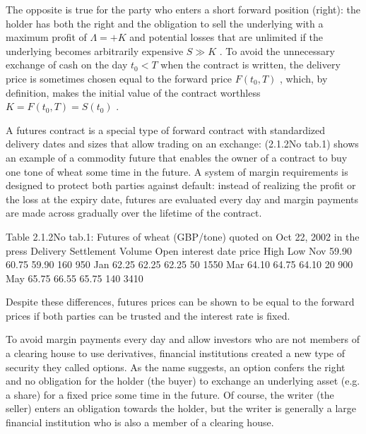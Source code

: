 \documentclass{beamer}
\begin{document}
	\begin{frame}
		The opposite is true for the party who enters a short forward position (right): the holder has both the right and the obligation to sell the underlying with a maximum profit of  $ \Lambda=+K$ and potential losses that are unlimited if the underlying becomes arbitrarily expensive $ S\gg K$ . To avoid the unnecessary exchange of cash on the day $ t_0<T$ when the contract is written, the delivery price is sometimes chosen equal to the forward price $ F(t_0,T)$ , which, by definition, makes the initial value of the contract worthless  $ K=F(t_0,T)=S(t_0)$ .
	\end{frame}
	\begin{frame}
		A futures contract is a special type of forward contract with standardized delivery dates and sizes that allow trading on an exchange: (2.1.2No tab.1) shows an example of a commodity future that enables the owner of a contract to buy one tone of wheat some time in the future. A system of margin requirements is designed to protect both parties against default: instead of realizing the profit or the loss at the expiry date, futures are evaluated every day and margin payments are made across gradually over the lifetime of the contract. 
		
		Table 2.1.2No tab.1: Futures of wheat (GBP/tone) quoted on Oct 22, 2002 in the press
		Delivery	 Settlement		 Volume	 Open interest
		date	 price	 High	 Low		
		Nov	 59.90	 60.75	 59.90	 160	 950
		Jan	 62.25	 62.25	 62.25	 50	 1550
		Mar	 64.10	 64.75	 64.10	 20	 900
		May	 65.75	 66.55	 65.75	 140	 3410
		
		Despite these differences, futures prices can be shown to be equal to the forward prices if both parties can be trusted and the interest rate is fixed.
		
		
	\end{frame}
	\begin{frame}
		To avoid margin payments every day and allow investors who are not members of a clearing house to use derivatives, financial institutions created a new type of security they called options. As the name suggests, an option confers the right and no obligation for the holder (the buyer) to exchange an underlying asset (e.g. a share) for a fixed price some time in the future. Of course, the writer (the seller) enters an obligation towards the holder, but the writer is generally a large financial institution who is also a member of a clearing house.
	\end{frame}
\end{document}
